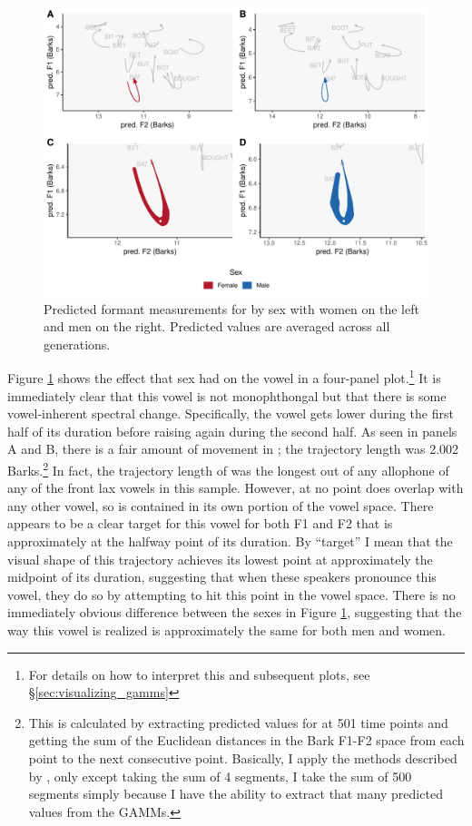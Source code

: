 \begin{figure}[tb!]
	\centering
	\includegraphics[width = 6.5in]{Figures/BAT/BAT_four_panel_plot_summarized.pdf}
	\caption[Predicted formant measurements for \bat by sex.]{Predicted formant measurements for \bat by sex with women on the left and men on the right. Predicted values are averaged across all generations.}
	\label{fig:BAT_four_panel_summarized}
\end{figure}

Figure \ref{fig:BAT_four_panel_summarized} shows the effect that sex had on the \bat vowel in a four-panel plot.\footnote{For details on how to interpret this and subsequent plots, see \S\ref{sec:visualizing_gamms}} It is immediately clear that this vowel is not monophthongal but that there is some vowel-inherent spectral change. Specifically, the vowel gets lower during the first half of its duration before raising again during the second half. As seen in panels A and B, there is a fair amount of movement in \bat; the trajectory length was 2.002 Barks.\footnote{This is calculated by extracting predicted values for \bat at 501 time points and getting the sum of the Euclidean distances in the Bark F1-F2 space from each point to the next consecutive point. Basically, I apply the methods described by \citet{fox_jacewicz_2009}, only except taking the sum of 4 segments, I take the sum of 500 segments simply because I have the ability to extract that many predicted values from the GAMMs.} In fact, the trajectory length of \bat was the longest out of any allophone of any of the front lax vowels in this sample. However, at no point does \bat overlap with any other vowel, so \bat is contained in its own portion of the vowel space. There appears to be a clear target for this vowel for both F1 and F2 that is approximately at the halfway point of its duration. By ``target'' I mean that the visual shape of this trajectory achieves its lowest point at approximately the midpoint of its duration, suggesting that when these speakers pronounce this vowel, they do so by attempting to hit this point in the vowel space. There is no immediately obvious difference between the sexes in Figure \ref{fig:BAT_four_panel_summarized}, suggesting that the way this vowel is realized is approximately the same for both men and women.

